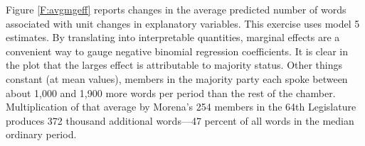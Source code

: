 \documentclass[letter,12pt]{article}
\begin{document}

Figure \ref{F:avgmgeff} reports changes in the average predicted number of words associated with unit changes in explanatory variables. This exercise uses model 5 estimates. By translating into interpretable quantities, marginal effects are a convenient way to gauge negative binomial regression coefficients. It is clear in the plot that the larges effect is attributable to majority status. Other things constant (at mean values), members in the majority party each spoke between about 1,000 and 1,900 more words per period than the rest of the chamber. Multiplication of that average by Morena's 254 members in the 64th Legislature produces 372 thousand additional words---47 percent of all words in the median ordinary period.
\end{document}
